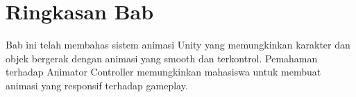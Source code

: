 \section{Ringkasan Bab}

Bab ini telah membahas sistem animasi Unity yang memungkinkan karakter dan objek bergerak dengan animasi yang smooth dan terkontrol. Pemahaman terhadap Animator Controller memungkinkan mahasiswa untuk membuat animasi yang responsif terhadap gameplay.
